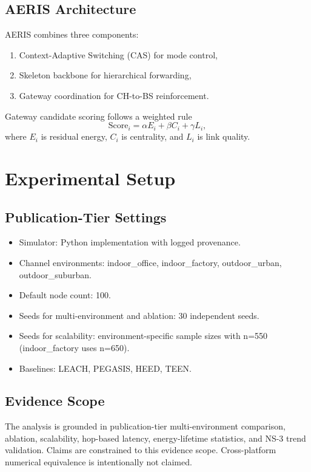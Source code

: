 \documentclass[sensors,article,submit,moreauthors,pdftex]{Definitions/mdpi}
\begin{document}
\subsection{AERIS Architecture}
AERIS combines three components:
\begin{enumerate}
\item Context-Adaptive Switching (CAS) for mode control,
\item Skeleton backbone for hierarchical forwarding,
\item Gateway coordination for CH-to-BS reinforcement.
\end{enumerate}
Gateway candidate scoring follows a weighted rule
\begin{equation}
\mathrm{Score}_i = \alpha E_i + \beta C_i + \gamma L_i,
\end{equation}
where $E_i$ is residual energy, $C_i$ is centrality, and $L_i$ is link quality.

\section{Experimental Setup}
\subsection{Publication-Tier Settings}
\begin{itemize}
\item Simulator: Python implementation with logged provenance.
\item Channel environments: indoor\_office, indoor\_factory, outdoor\_urban, outdoor\_suburban.
\item Default node count: 100.
\item Seeds for multi-environment and ablation: 30 independent seeds.
\item Seeds for scalability: environment-specific sample sizes with n=550 (indoor\_factory uses n=650).
\item Baselines: LEACH, PEGASIS, HEED, TEEN.
\end{itemize}

\subsection{Evidence Scope}
The analysis is grounded in publication-tier multi-environment comparison, ablation, scalability, hop-based latency, energy-lifetime statistics, and NS-3 trend validation. Claims are constrained to this evidence scope. Cross-platform numerical equivalence is intentionally not claimed.
\end{document}
